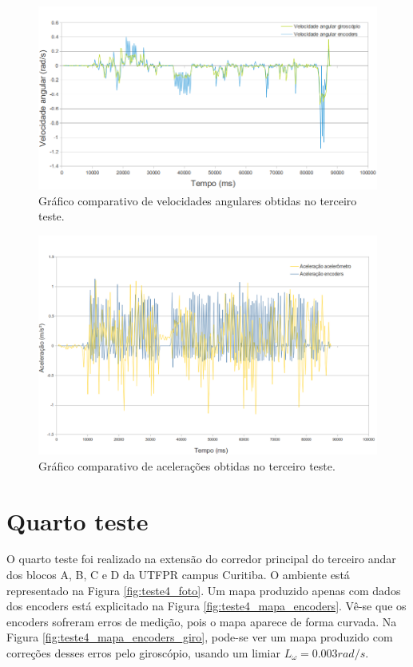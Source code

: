 \begin{figure}[H]
	\centering
	\includegraphics[width=1\textwidth]{./figuras/testes/teste3/grafico_giro.png}
	\caption{Gráfico comparativo de velocidades angulares obtidas no terceiro teste.}
	\label{fig:teste3_giro_grafico}
\end{figure}

\begin{figure}[H]
	\centering
	\includegraphics[width=1\textwidth]{./figuras/testes/teste3/grafico_acel.png}
	\caption{Gráfico comparativo de acelerações obtidas no terceiro teste.}
	\label{fig:teste3_acel_grafico}
\end{figure}

\section{Quarto teste}

O quarto teste foi realizado na extensão do corredor principal do terceiro andar dos blocos A, B, C e D da UTFPR campus Curitiba. O ambiente está representado na Figura \ref{fig:teste4_foto}. Um mapa produzido apenas com dados dos encoders está explicitado na Figura \ref{fig:teste4_mapa_encoders}. Vê-se que os encoders sofreram erros de medição, pois o mapa aparece de forma curvada. Na Figura \ref{fig:teste4_mapa_encoders_giro}, pode-se ver um mapa produzido com correções desses erros pelo giroscópio, usando um limiar $L_\omega = 0.003 \unit{rad/s}$.

